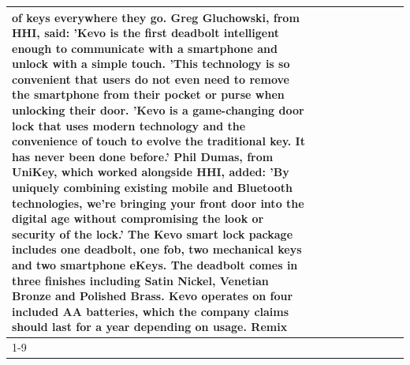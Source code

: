 \begin{table}[H]
\begin{tabular}{lllrlllll}
of keys everywhere they go. Greg Gluchowski, from HHI, said: 'Kevo is the first deadbolt intelligent enough to communicate with a smartphone and unlock with a simple touch. 'This technology is so convenient that users do not even need to remove the smartphone from their pocket or purse when unlocking their door. 'Kevo is a game-changing door lock that uses modern technology and the convenience of touch to evolve the traditional key. It has never been done before.' Phil Dumas, from UniKey, which worked alongside HHI, added: 'By uniquely combining existing mobile and Bluetooth technologies, we’re bringing your front door into the digital age without compromising the look or security of the lock.' The Kevo smart lock package includes one deadbolt, one fob, two mechanical keys and two smartphone eKeys. The deadbolt comes in three finishes including Satin Nickel, Venetian Bronze and Polished Brass. Kevo operates on four included AA batteries, which the company claims should last for a year depending on usage. Remix \\
\cline{1-9}

\end{tabular}
\end{table}
